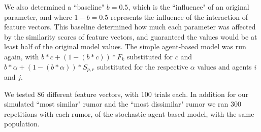 We also determined a ``baseline" $ b = 0.5 $, which is the ``influence" of an original parameter, and where $ 1 - b = 0.5 $ represents the influence of the interaction of feature vectors. This baseline determined how much each parameter was affected by the similarity scores of feature vectors, and guaranteed the values would be at least half of the original model values. The simple agent-based model was run again, with $ b*c + (1-(b*c))*F_k $ substituted for $ c $ and $ b*\alpha + (1-(b*\alpha))*S_{p,r} $ substituted for the respective $ \alpha $ values and agents $ i $ and $ j $.

We tested $ 86 $ different feature vectors, with $ 100 $ trials each. In addition for our simulated ``most similar" rumor and the ``most dissimilar" rumor  we ran $ 300 $ repetitions with each rumor, of the stochastic agent based model, with the same population.